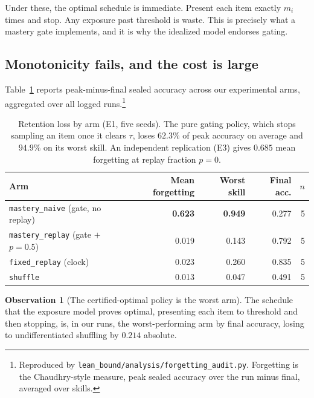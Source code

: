 \documentclass[11pt]{article}
\theoremstyle{plain}
\theoremstyle{definition}
\newtheorem{observation}{Observation}
\theoremstyle{remark}
\begin{document}
Under these, the optimal schedule is immediate. Present each item exactly $m_i$
times and stop. Any exposure past threshold is waste. This is precisely what a
mastery gate implements, and it is why the idealized model endorses gating.

\subsection{Monotonicity fails, and the cost is large}

Table~\ref{tab:forget} reports peak-minus-final sealed accuracy across our
experimental arms, aggregated over all logged runs.\footnote{Reproduced by
\texttt{lean\_bound/analysis/forgetting\_audit.py}. Forgetting is the
Chaudhry-style measure, peak sealed accuracy over the run minus final, averaged
over skills.}

\begin{table}[ht]
\centering
\small
\begin{tabular}{@{}lrrrr@{}}
\toprule
Arm & Mean forgetting & Worst skill & Final acc. & $n$ \\
\midrule
\texttt{mastery\_naive} (gate, no replay) & \textbf{0.623} & \textbf{0.949} & 0.277 & 5 \\
\texttt{mastery\_replay} (gate $+$ $p{=}0.5$) & 0.019 & 0.143 & 0.792 & 5 \\
\texttt{fixed\_replay} (clock) & 0.023 & 0.260 & 0.835 & 5 \\
\texttt{shuffle} & 0.013 & 0.047 & 0.491 & 5 \\
\bottomrule
\end{tabular}
\caption{Retention loss by arm (E1, five seeds). The pure gating policy, which
stops sampling an item once it clears $\tau$, loses $62.3\%$ of peak accuracy on
average and $94.9\%$ on its worst skill. An independent replication (E3) gives
$0.685$ mean forgetting at replay fraction $p=0$.}
\label{tab:forget}
\end{table}

\begin{observation}[The certified-optimal policy is the worst arm]
\label{obs:worst}
The schedule that the exposure model proves optimal, presenting each item to
threshold and then stopping, is, in our runs, the worst-performing arm by final
accuracy, losing to undifferentiated shuffling by $0.214$ absolute.
\end{observation}
\end{document}
